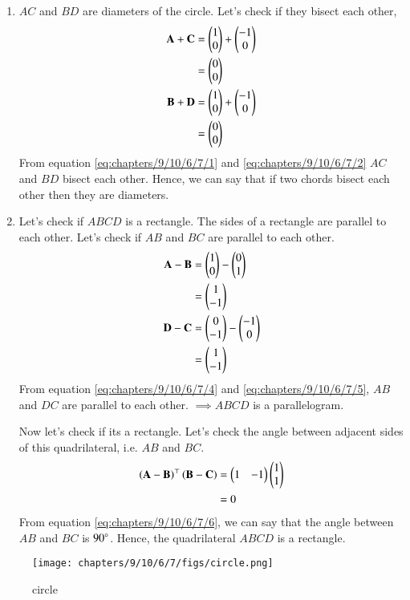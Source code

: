 \documentclass[journal,12pt,twocolumn]{IEEEtran}
\let\vec\mathbf
\begin{document}
\begin{enumerate}
    \item $AC$ and $BD$ are diameters of the circle. Let's check if they bisect each other,
    \begin{align}
        \vec{A} + \vec{C} &= \myvec{1 \\ 0} + \myvec{-1 \\ 0}\\
        \label{eq:chapters/9/10/6/7/1} &= \myvec{0 \\ 0} \\
        \vec{B} + \vec{D} &= \myvec{1 \\ 0} + \myvec{-1 \\ 0}\\
        \label{eq:chapters/9/10/6/7/2} &= \myvec{0 \\ 0}
    \end{align}
    From equation \eqref{eq:chapters/9/10/6/7/1} and \eqref{eq:chapters/9/10/6/7/2} $AC$ and $BD$ bisect each other.
    Hence, we can say that if two chords bisect each other then they are diameters.
%
    \item Let's check if $ABCD$ is a rectangle.
    The sides of a rectangle are parallel to each other. Let's check if $AB$ and $BC$ are parallel to each other.
    \begin{align}
        \vec{A} - \vec{B} &= \myvec{1 \\ 0} - \myvec{0 \\ 1}\\
        \label{eq:chapters/9/10/6/7/4} &= \myvec{1 \\ -1} \\
        \vec{D} - \vec{C} &= \myvec{0\\ -1} - \myvec{-1 \\ 0}\\
        \label{eq:chapters/9/10/6/7/5} &= \myvec{1 \\ -1} 
    \end{align}
    From equation \eqref{eq:chapters/9/10/6/7/4} and \eqref{eq:chapters/9/10/6/7/5}, $AB$ and $DC$ are parallel to each other.
    $\implies ABCD$ is a parallelogram.

    Now let's check if its a rectangle.
    Let's check the angle between adjacent sides of this quadrilateral, i.e. $AB$ and $BC$.
    \begin{align}
        \label{eq:chapters/9/10/6/7/6} \brak{\vec{A} - \vec{B}}^\top \brak{\vec{B} - \vec{C}} &=  \myvec{1 & -1} \myvec{1 \\ 1} \\
        &= 0
    \end{align}
    From equation \eqref{eq:chapters/9/10/6/7/6}, we can say that the angle between $AB$ and $BC$ is $90\degree$.
    Hence, the quadrilateral $ABCD$ is a rectangle.
\end{enumerate}

\begin{figure}[H]
    \centering
    \texttt{[image: chapters/9/10/6/7/figs/circle.png]}
    \caption{circle}
    \label{fig:chapters/9/10/6/7/circle}
\end{figure}
\end{document}
